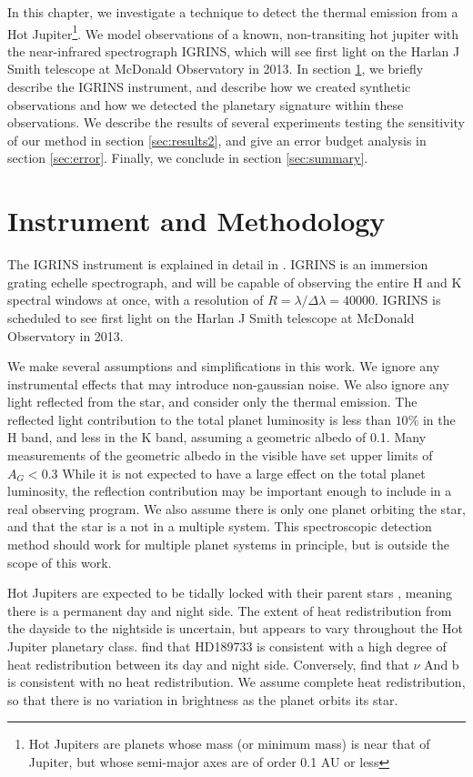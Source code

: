 \documentclass[11pt]{report}     %
\begin{document}
In this chapter, we investigate a technique to detect the thermal
emission from a Hot Jupiter\footnote{Hot Jupiters are planets whose
  mass (or minimum mass) is near that of Jupiter, but whose semi-major
  axes are of order 0.1 AU or less}. We model observations of a known,
non-transiting hot jupiter with the near-infrared spectrograph IGRINS,
which will see first light on the Harlan J Smith telescope at McDonald
Observatory in 2013. In section \ref{sec:method}, we briefly describe the IGRINS instrument, and describe how we created synthetic observations and how we detected the planetary signature within these observations. We describe the results of several experiments testing the sensitivity of our method in section \ref{sec:results2}, and give an error budget analysis in section \ref{sec:error}. Finally, we conclude in section \ref{sec:summary}. 


\section{Instrument and Methodology}
\label{sec:method}
The IGRINS instrument is explained in detail in \cite{IGRINS}. IGRINS
is an immersion grating echelle spectrograph, and will
be capable of observing the entire H and K spectral windows at once,
with a resolution of $R=\lambda / \Delta \lambda = 40000$. IGRINS is
scheduled to see first light on the Harlan J Smith telescope at McDonald
Observatory in 2013.

We make several assumptions and simplifications in this work. We
ignore any instrumental effects that may introduce non-gaussian noise.
We also ignore any light reflected from the star, and
consider only the thermal emission. The reflected light
contribution to the total planet luminosity is less than $10\%$ in the
H band, and less in the K band, assuming a geometric albedo of 0.1. 
Many measurements of the
geometric albedo in the visible have set upper limits of $A_G < 0.3$
\citep[see e.g.][and references therein]{Madhusudhan2012} While it is not expected to have a large effect on
the total planet luminosity, the reflection contribution may be
important enough to include in a real observing program. We also assume
there is only one planet orbiting the star, and that
the star is a not in a multiple system. This spectroscopic detection
method should work for multiple planet systems in principle, but is
outside the scope of this work.

Hot Jupiters are expected to be tidally locked with their parent stars
\citep{Fabrycky2010}, meaning there is a permanent day and night side. The extent
of heat redistribution from the dayside to the nightside is uncertain, 
but appears to vary throughout
the Hot Jupiter planetary class. \cite{Knutson2007_2} find that
HD189733 is consistent with a high degree of heat redistribution
between its day and night side. Conversely, \cite{Harrington2006} find
that $\nu$ And b is consistent with no heat redistribution. We assume 
complete heat redistribution, so that there is
no variation in brightness as the planet orbits its star.
\end{document}
